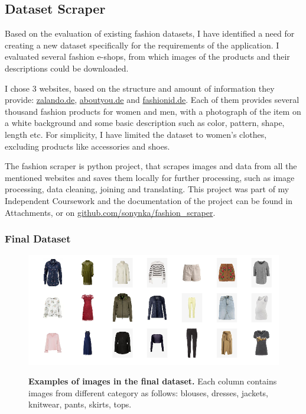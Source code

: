 \documentclass{article}
\begin{document}
\subsection{Dataset Scraper}
Based on the evaluation of existing fashion datasets, I have identified a need for creating a new dataset specifically for the requirements of the application. I evaluated several fashion e-shops, from which images of the products and their descriptions could be downloaded. 

I chose 3 websites, based on the structure and amount of information they provide: \href{https://www.zalando.de/damen-home/}{zalando.de}, \href{https://www.aboutyou.de/}{aboutyou.de} and \href{https://www.fashionid.de/damen/}{fashionid.de}. Each of them provides several thousand fashion products for women and men, with a photograph of the item on a white background and some basic description such as color, pattern, shape, length etc. For simplicity, I have limited the dataset to women's clothes, excluding products like accessories and shoes.

The fashion scraper is python project, that scrapes images and data from all the mentioned websites and saves them locally for further processing, such as image processing, data cleaning, joining and translating. This project was part of my Independent Coursework and the documentation of the project can be found in Attachments, or on \href{https://github.com/sonynka/fashion_scraper}{github.com/sonynka/fashion\_scraper}.

\subsubsection{Final Dataset}

\begin{figure}[h]
\centering
{\includegraphics[width=\linewidth]{dataset_examples/img_grid2}}
\caption{\label{fig:dataset} \textbf{Examples of images in the final dataset.} Each column contains images from different category as follows: blouses, dresses, jackets, knitwear, pants, skirts, tops.}
\end{figure}
\end{document}
